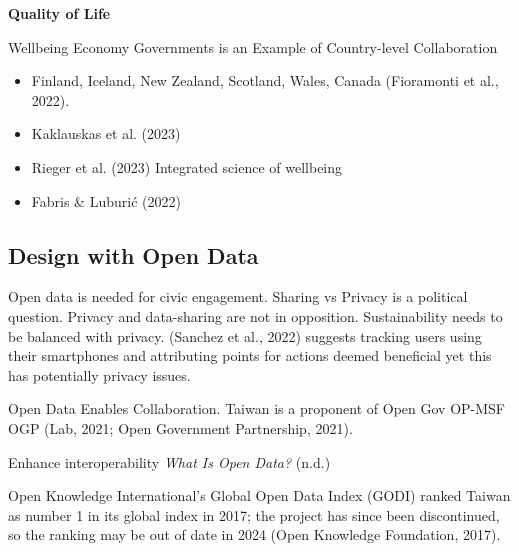 \documentclass[
  letterpaper,
  DIV=11,
  numbers=noendperiod]{scrartcl}
\providecommand{\tightlist}{%
  \setlength{\itemsep}{0pt}\setlength{\parskip}{0pt}}\usepackage{longtable,booktabs,array}
\begin{document}
\textbf{Quality of Life}

Wellbeing Economy Governments is an Example of Country-level
Collaboration

\begin{itemize}
\tightlist
\item
  Finland, Iceland, New Zealand, Scotland, Wales, Canada (Fioramonti et
  al., 2022).
\item
  Kaklauskas et al. (2023)
\item
  Rieger et al. (2023) Integrated science of wellbeing
\item
  Fabris \& Luburić (2022)
\end{itemize}

\subsection{Design with Open Data}\label{design-with-open-data}

Open data is needed for civic engagement. Sharing vs Privacy is a
political question. Privacy and data-sharing are not in opposition.
Sustainability needs to be balanced with privacy. (Sanchez et al., 2022)
suggests tracking users using their smartphones and attributing points
for actions deemed beneficial yet this has potentially privacy issues.

Open Data Enables Collaboration. Taiwan is a proponent of Open Gov
OP-MSF OGP (Lab, 2021; Open Government Partnership, 2021).

Enhance interoperability \emph{What Is {Open Data}?} (n.d.)

Open Knowledge International's Global Open Data Index (GODI) ranked
Taiwan as number 1 in its global index in 2017; the project has since
been discontinued, so the ranking may be out of date in 2024 (Open
Knowledge Foundation, 2017).
\end{document}
